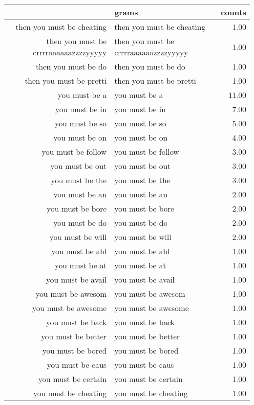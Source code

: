 \begin{table}[ht]
\centering
\begin{tabular}{rlr}
  \hline
 & grams & counts \\ 
  \hline
then you must be cheating & then you must be cheating & 1.00 \\ 
  then you must be crrrraaaaaazzzzyyyyy & then you must be crrrraaaaaazzzzyyyyy & 1.00 \\ 
  then you must be do & then you must be do & 1.00 \\ 
  then you must be pretti & then you must be pretti & 1.00 \\ 
  you must be a & you must be a & 11.00 \\ 
  you must be in & you must be in & 7.00 \\ 
  you must be so & you must be so & 5.00 \\ 
  you must be on & you must be on & 4.00 \\ 
  you must be follow & you must be follow & 3.00 \\ 
  you must be out & you must be out & 3.00 \\ 
  you must be the & you must be the & 3.00 \\ 
  you must be an & you must be an & 2.00 \\ 
  you must be bore & you must be bore & 2.00 \\ 
  you must be do & you must be do & 2.00 \\ 
  you must be will & you must be will & 2.00 \\ 
  you must be abl & you must be abl & 1.00 \\ 
  you must be at & you must be at & 1.00 \\ 
  you must be avail & you must be avail & 1.00 \\ 
  you must be awesom & you must be awesom & 1.00 \\ 
  you must be awesome & you must be awesome & 1.00 \\ 
  you must be back & you must be back & 1.00 \\ 
  you must be better & you must be better & 1.00 \\ 
  you must be bored & you must be bored & 1.00 \\ 
  you must be caus & you must be caus & 1.00 \\ 
  you must be certain & you must be certain & 1.00 \\ 
  you must be cheating & you must be cheating & 1.00 \\ 

\end{tabular}
\end{table}
